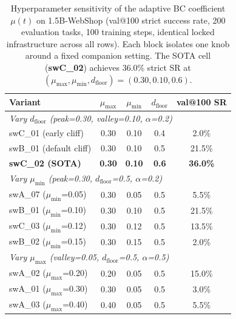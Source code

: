 
\begin{table}[h]
\centering
\small
\begin{tabular}{lcccc}
\toprule
Variant & $\mu_{\max}$ & $\mu_{\min}$ & $d_{\text{floor}}$ & val@100 SR \\
\midrule
\multicolumn{5}{l}{\textit{Vary $d_{\text{floor}}$ (peak=0.30, valley=0.10, $\alpha$=0.2)}} \\
\midrule
swC\_01 (early cliff)        & 0.30 & 0.10 & 0.4 & \phantom{0}2.0\% \\
swB\_01 (default cliff)      & 0.30 & 0.10 & 0.5 & 21.5\% \\
\textbf{swC\_02 (SOTA)}      & \textbf{0.30} & \textbf{0.10} & \textbf{0.6} & \textbf{36.0\%} \\
\midrule
\multicolumn{5}{l}{\textit{Vary $\mu_{\min}$ (peak=0.30, $d_{\text{floor}}$=0.5, $\alpha$=0.2)}} \\
\midrule
swA\_07 ($\mu_{\min}$=0.05)  & 0.30 & 0.05 & 0.5 & \phantom{0}5.5\% \\
swB\_01 ($\mu_{\min}$=0.10)  & 0.30 & 0.10 & 0.5 & 21.5\% \\
swC\_03 ($\mu_{\min}$=0.12)  & 0.30 & 0.12 & 0.5 & 13.5\% \\
swB\_02 ($\mu_{\min}$=0.15)  & 0.30 & 0.15 & 0.5 & \phantom{0}2.0\% \\
\midrule
\multicolumn{5}{l}{\textit{Vary $\mu_{\max}$ (valley=0.05, $d_{\text{floor}}$=0.5, $\alpha$=0.5)}} \\
\midrule
swA\_02 ($\mu_{\max}$=0.20)  & 0.20 & 0.05 & 0.5 & 15.0\% \\
swA\_01 ($\mu_{\max}$=0.30)  & 0.30 & 0.05 & 0.5 & \phantom{0}3.0\% \\
swA\_03 ($\mu_{\max}$=0.40)  & 0.40 & 0.05 & 0.5 & \phantom{0}5.5\% \\
\bottomrule
\end{tabular}
\caption{Hyperparameter sensitivity of the adaptive BC coefficient $\mu(t)$ on
1.5B-WebShop (val@100 strict success rate, 200 evaluation tasks,
100 training steps, identical locked infrastructure across all rows). Each
block isolates one knob around a fixed companion setting. The SOTA cell
(\textbf{swC\_02}) achieves 36.0\% strict SR at
$(\mu_{\max},\mu_{\min},d_{\text{floor}})=(0.30,0.10,0.6)$.}
\label{tab:app-mu-sensitivity}
\end{table}

